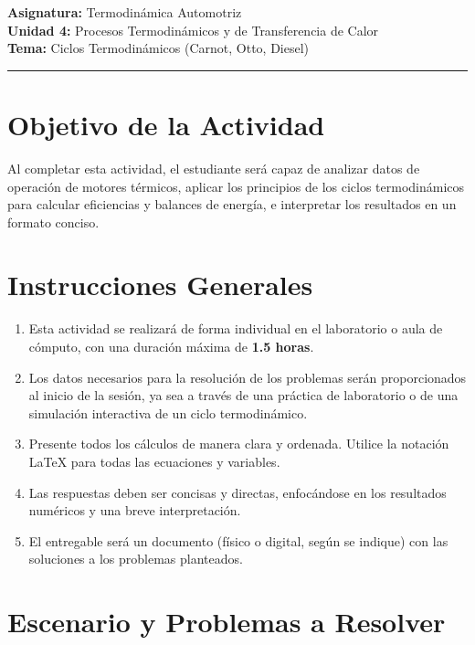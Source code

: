 \documentclass{article}
\begin{document}

\textbf{Asignatura:} Termodinámica Automotriz \\
\textbf{Unidad 4:} Procesos Termodinámicos y de Transferencia de Calor \\
\textbf{Tema:} Ciclos Termodinámicos (Carnot, Otto, Diesel)

\vspace{5mm}
\hrule
\vspace{5mm}

\section*{Objetivo de la Actividad}

Al completar esta actividad, el estudiante será capaz de analizar datos de operación de motores térmicos, aplicar los principios de los ciclos termodinámicos para calcular eficiencias y balances de energía, e interpretar los resultados en un formato conciso.

\section*{Instrucciones Generales}

\begin{enumerate}
    \item Esta actividad se realizará de forma individual en el laboratorio o aula de cómputo, con una duración máxima de \textbf{1.5 horas}.
    \item Los datos necesarios para la resolución de los problemas serán proporcionados al inicio de la sesión, ya sea a través de una práctica de laboratorio o de una simulación interactiva de un ciclo termodinámico.
    \item Presente todos los cálculos de manera clara y ordenada. Utilice la notación LaTeX para todas las ecuaciones y variables.
    \item Las respuestas deben ser concisas y directas, enfocándose en los resultados numéricos y una breve interpretación.
    \item El entregable será un documento (físico o digital, según se indique) con las soluciones a los problemas planteados.
\end{enumerate}

\section*{Escenario y Problemas a Resolver}
\end{document}
